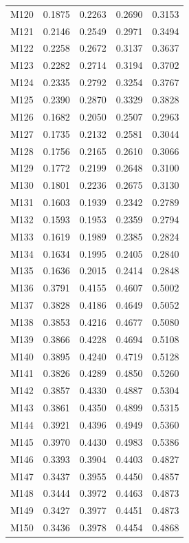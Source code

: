 \begin{longtable}{lrrrr}
M120 & 0.1875 & 0.2263 & 0.2690 & 0.3153 \\
M121 & 0.2146 & 0.2549 & 0.2971 & 0.3494 \\
M122 & 0.2258 & 0.2672 & 0.3137 & 0.3637 \\
M123 & 0.2282 & 0.2714 & 0.3194 & 0.3702 \\
M124 & 0.2335 & 0.2792 & 0.3254 & 0.3767 \\
M125 & 0.2390 & 0.2870 & 0.3329 & 0.3828 \\
M126 & 0.1682 & 0.2050 & 0.2507 & 0.2963 \\
M127 & 0.1735 & 0.2132 & 0.2581 & 0.3044 \\
M128 & 0.1756 & 0.2165 & 0.2610 & 0.3066 \\
M129 & 0.1772 & 0.2199 & 0.2648 & 0.3100 \\
M130 & 0.1801 & 0.2236 & 0.2675 & 0.3130 \\
M131 & 0.1603 & 0.1939 & 0.2342 & 0.2789 \\
M132 & 0.1593 & 0.1953 & 0.2359 & 0.2794 \\
M133 & 0.1619 & 0.1989 & 0.2385 & 0.2824 \\
M134 & 0.1634 & 0.1995 & 0.2405 & 0.2840 \\
M135 & 0.1636 & 0.2015 & 0.2414 & 0.2848 \\
M136 & 0.3791 & 0.4155 & 0.4607 & 0.5002 \\
M137 & 0.3828 & 0.4186 & 0.4649 & 0.5052 \\
M138 & 0.3853 & 0.4216 & 0.4677 & 0.5080 \\
M139 & 0.3866 & 0.4228 & 0.4694 & 0.5108 \\
M140 & 0.3895 & 0.4240 & 0.4719 & 0.5128 \\
M141 & 0.3826 & 0.4289 & 0.4850 & 0.5260 \\
M142 & 0.3857 & 0.4330 & 0.4887 & 0.5304 \\
M143 & 0.3861 & 0.4350 & 0.4899 & 0.5315 \\
M144 & 0.3921 & 0.4396 & 0.4949 & 0.5360 \\
M145 & 0.3970 & 0.4430 & 0.4983 & 0.5386 \\
M146 & 0.3393 & 0.3904 & 0.4403 & 0.4827 \\
M147 & 0.3437 & 0.3955 & 0.4450 & 0.4857 \\
M148 & 0.3444 & 0.3972 & 0.4463 & 0.4873 \\
M149 & 0.3427 & 0.3977 & 0.4451 & 0.4873 \\
M150 & 0.3436 & 0.3978 & 0.4454 & 0.4868 \\

\end{longtable}
